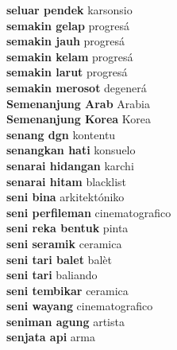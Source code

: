 \textbf{ seluar pendek  } karsonsio \\
\textbf{ semakin gelap  } progresá \\
\textbf{ semakin jauh  } progresá \\
\textbf{ semakin kelam  } progresá \\
\textbf{ semakin larut  } progresá \\
\textbf{ semakin merosot  } degenerá \\
\textbf{ Semenanjung Arab  } Arabia \\
\textbf{ Semenanjung Korea  } Korea \\
\textbf{ senang dgn  } kontentu \\
\textbf{ senangkan hati  } konsuelo \\
\textbf{ senarai hidangan  } karchi \\
\textbf{ senarai hitam  } blacklist \\
\textbf{ seni bina  } arkitektóniko \\
\textbf{ seni perfileman  } cinematografico \\
\textbf{ seni reka bentuk  } pinta \\
\textbf{ seni seramik  } ceramica \\
\textbf{ seni tari balet  } balèt \\
\textbf{ seni tari  } baliando \\
\textbf{ seni tembikar  } ceramica \\
\textbf{ seni wayang  } cinematografico \\
\textbf{ seniman agung  } artista \\
\textbf{ senjata api  } arma \\
